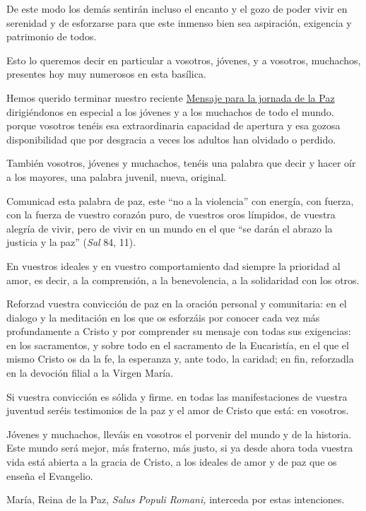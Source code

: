 De este modo los demás sentirán incluso el encanto y el gozo de poder
vivir en serenidad y de esforzarse para que este inmenso bien sea
aspiración, exigencia y patrimonio de todos.

Esto lo queremos decir en particular a vosotros, jóvenes, y a vosotros,
muchachos, presentes hoy muy numerosos en esta basílica.

Hemos querido terminar nuestro reciente
\href{/content/paul-vi/es/messages/peace/documents/hf_p-vi_mes_19771208_xi-world-day-for-peace.html}{Mensaje
	para la jornada de la Paz} dirigiéndonos en especial a los jóvenes y a
los muchachos de todo el mundo. porque vosotros tenéis esa
extraordinaria capacidad de apertura y esa gozosa disponibilidad que por
desgracia a veces los adultos han olvidado o perdido.

También vosotros, jóvenes y muchachos, tenéis una palabra que decir y
hacer oír a los mayores, una palabra juvenil, nueva, original.

Comunicad esta palabra de paz, este ``no a la violencia'' con energía,
con fuerza, con la fuerza de vuestro corazón puro, de vuestros oros
límpidos, de vuestra alegría de vivir, pero de vivir en un mundo en el
que ``se darán el abrazo la justicia y la paz'' (\emph{Sal} 84, 11).

En vuestros ideales y en vuestro comportamiento dad siempre la prioridad
al amor, es decir, a la comprensión, a la benevolencia, a la solidaridad
con los otros.

Reforzad vuestra convicción de paz en la oración personal y comunitaria:
en el dialogo y la meditación en los que os esforzáis por conocer cada
vez más profundamente a Cristo y por comprender su mensaje con todas sus
exigencias: en los sacramentos, y sobre todo en el sacramento de la
Eucaristía, en el que el mismo Cristo os da la fe, la esperanza y, ante
todo, la caridad; en fin, reforzadla en la devoción filial a la Virgen
María.

Si vuestra convicción es sólida y firme. en todas las manifestaciones de
vuestra juventud seréis testimonios de la paz y el amor de Cristo que
está: en vosotros.

Jóvenes y muchachos, lleváis en vosotros el porvenir del mundo y de la
historia. Este mundo será mejor, más fraterno, más justo, si ya desde
ahora toda vuestra vida está abierta a la gracia de Cristo, a los
ideales de amor y de paz que os enseña el Evangelio.

María, Reina de la Paz, \emph{Salus Populi Romani,} interceda por estas
intenciones.

